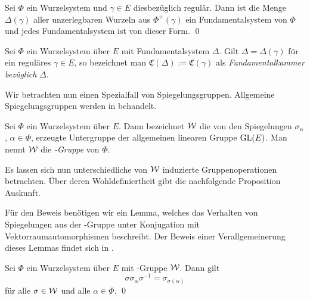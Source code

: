 \begin{thm}
  \label{thm:base}
  Sei $\Phi$ ein Wurzelsystem und $\gamma \in E$ diesbezüglich regulär.
  Dann ist die Menge $\Delta(\gamma)$ aller unzerlegbaren Wurzeln aus $\Phi^+(\gamma)$ ein Fundamentalsystem von $\Phi$ und jedes Fundamentalsystem ist von dieser Form. \qed
\end{thm}

\begin{defn}
  Sei $\Phi$ ein Wurzelsystem über $E$ mit Fundamentalsystem $\Delta$.
  Gilt $\Delta = \Delta(\gamma)$ für ein reguläres $\gamma \in E$, so bezeichnet man $\mathfrak{C}(\Delta) := \mathfrak{C}(\gamma)$ als \emph{Fundamentalkammer bezüglich} $\Delta$.
\end{defn}

Wir betrachten nun einen Spezialfall von Spiegelungsgruppen. Allgemeine Spiegelungsgruppen werden in \cite{humphreys1992reflection} behandelt.

\begin{defn}
  \label{def:weylgroup}
  Sei $\Phi$ ein Wurzelsystem über $E$. 
  Dann bezeichnet $\mathcal{W}$ die von den Spiegelungen $\sigma_\alpha$, $\alpha \in \Phi$, erzeugte Untergruppe der allgemeinen linearen Gruppe $\operatorname{GL}(E)$. 
  Man nennt $\mathcal{W}$ die \emph{\weyl\hyp{}Gruppe} von $\Phi$.
\end{defn}

Es lassen sich nun unterschiedliche von $\mathcal{W}$ induzierte Gruppenoperationen betrachten. Über deren Wohldefiniertheit gibt die nachfolgende Proposition Auskunft. 

Für den Beweis benötigen wir ein Lemma, welches das Verhalten von Spiegelungen aus der \weyl\hyp{}Gruppe unter Konjugation mit Vektorraumautomorphismen beschreibt. 
Der Beweis einer Verallgemeinerung dieses Lemmas findet sich in \cite[S.43]{humphreys1972introduction}.

\begin{lem}
  \label{lem:conjReflection}
  Sei $\Phi$ ein Wurzelsystem über $E$ mit \weyl\hyp{}Gruppe $\mathcal{W}$.
  Dann gilt 
  \begin{displaymath}
    \sigma \sigma_\alpha \sigma^{-1} = \sigma_{\sigma(\alpha)} 
  \end{displaymath}
  für alle $\sigma \in \mathcal{W}$ und alle $\alpha \in \Phi$. \qed
\end{lem}

